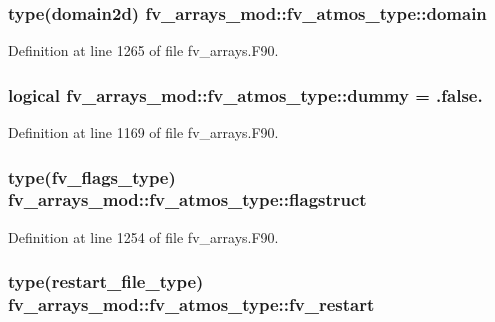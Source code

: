 \subsubsection[{domain}]{\setlength{\rightskip}{0pt plus 5cm}type(domain2d) fv\-\_\-arrays\-\_\-mod\-::fv\-\_\-atmos\-\_\-type\-::domain}\label{structfv__arrays__mod_1_1fv__atmos__type_ade8a5697c963d272c6d9deff35fb15f2}


Definition at line 1265 of file fv\-\_\-arrays.\-F90.

\subsubsection[{dummy}]{\setlength{\rightskip}{0pt plus 5cm}logical fv\-\_\-arrays\-\_\-mod\-::fv\-\_\-atmos\-\_\-type\-::dummy = .false.}\label{structfv__arrays__mod_1_1fv__atmos__type_a124c10f670d516b0517bdc038b66c857}


Definition at line 1169 of file fv\-\_\-arrays.\-F90.

\subsubsection[{flagstruct}]{\setlength{\rightskip}{0pt plus 5cm}type({\bf fv\-\_\-flags\-\_\-type}) fv\-\_\-arrays\-\_\-mod\-::fv\-\_\-atmos\-\_\-type\-::flagstruct}\label{structfv__arrays__mod_1_1fv__atmos__type_a690b87301c4d59a583cb3b291c6d2701}


Definition at line 1254 of file fv\-\_\-arrays.\-F90.

\subsubsection[{fv\-\_\-restart}]{\setlength{\rightskip}{0pt plus 5cm}type(restart\-\_\-file\-\_\-type) fv\-\_\-arrays\-\_\-mod\-::fv\-\_\-atmos\-\_\-type\-::fv\-\_\-restart}\label{structfv__arrays__mod_1_1fv__atmos__type_a81c0a2a6d32e9d1ec76ba25429fe964e}


